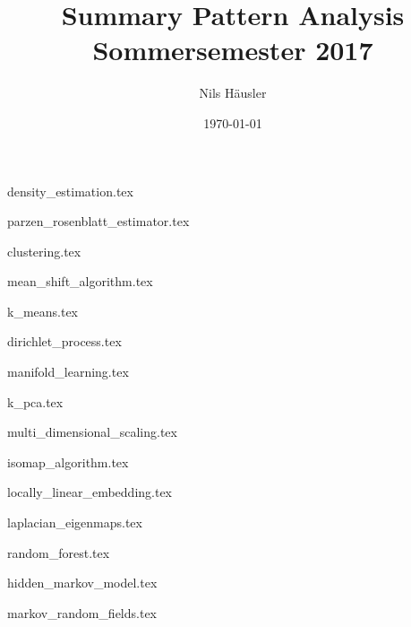 \documentclass[12p]{article}
\title{Summary Pattern Analysis\\ Sommersemester 2017}
\author{Nils Häusler}
\date{\today}
\begin{document}
\begin{titlepage}
  \maketitle
  \thispagestyle{empty}
\end{titlepage}

\newpage
{density_estimation.tex}

\newpage
{parzen_rosenblatt_estimator.tex}

\newpage
{clustering.tex}

\newpage
{mean_shift_algorithm.tex}

\newpage
{k_means.tex}

\newpage
{dirichlet_process.tex}

\newpage
{manifold_learning.tex}

\newpage
{k_pca.tex}

\newpage
{multi_dimensional_scaling.tex}

\newpage
{isomap_algorithm.tex}

\newpage
{locally_linear_embedding.tex}

\newpage
{laplacian_eigenmaps.tex}

\newpage
{random_forest.tex}

\newpage
{hidden_markov_model.tex}

\newpage
{markov_random_fields.tex}
\end{document}
